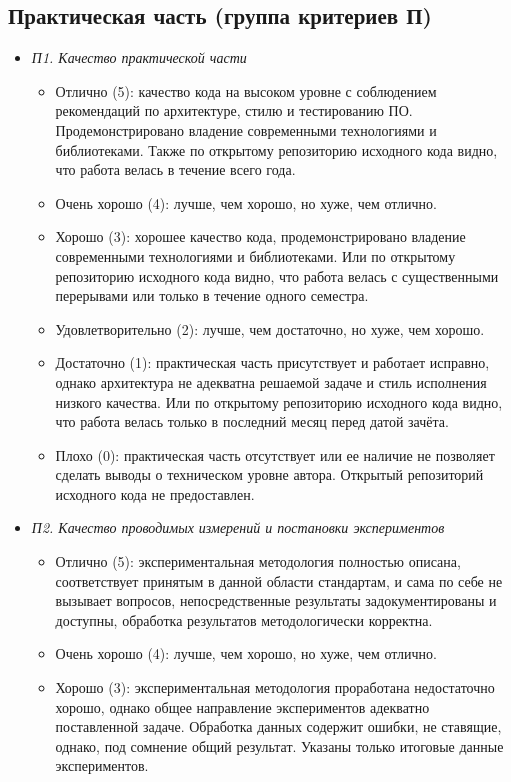 \documentclass{article}
\begin{document}
\subsection{Практическая часть (группа критериев П)}
\begin{itemize}
    \item \textit{П1. Качество практической части}
    \begin{itemize}
        \item Отлично (5): качество кода на высоком уровне с соблюдением рекомендаций по архитектуре, стилю и тестированию ПО. Продемонстрировано владение современными технологиями и библиотеками. Также по открытому репозиторию исходного кода  видно, что работа велась в течение всего года.
        \item Очень хорошо (4): лучше, чем хорошо, но хуже, чем отлично.
        \item Хорошо (3): хорошее качество кода, продемонстрировано владение современными технологиями и библиотеками. Или по открытому репозиторию исходного кода видно, что работа велась с существенными перерывами или только в течение одного семестра.
        \item Удовлетворительно (2): лучше, чем достаточно, но хуже, чем хорошо.
        \item Достаточно (1): практическая часть присутствует и работает исправно, однако архитектура не адекватна решаемой задаче и стиль исполнения низкого качества. Или по открытому репозиторию исходного кода видно, что работа велась только в последний месяц перед датой зачёта.
        \item Плохо (0): практическая часть отсутствует или ее наличие не позволяет сделать выводы о техническом уровне автора. Открытый репозиторий исходного кода не предоставлен.
    \end{itemize}
    \item \textit{П2. Качество проводимых измерений и постановки экспериментов}
    \begin{itemize}
        \item Отлично (5): 	экспериментальная методология полностью описана, соответствует принятым в данной области стандартам, и сама по себе не вызывает вопросов, непосредственные результаты задокументированы и доступны, обработка результатов методологически корректна.
        \item Очень хорошо (4): лучше, чем хорошо, но хуже, чем отлично.
        \item Хорошо (3): экспериментальная методология проработана недостаточно хорошо, однако общее направление экспериментов адекватно поставленной задаче. Обработка данных содержит ошибки, не ставящие, однако, под сомнение общий результат. Указаны только итоговые данные экспериментов.

\end{itemize}
\end{itemize}
\end{document}
